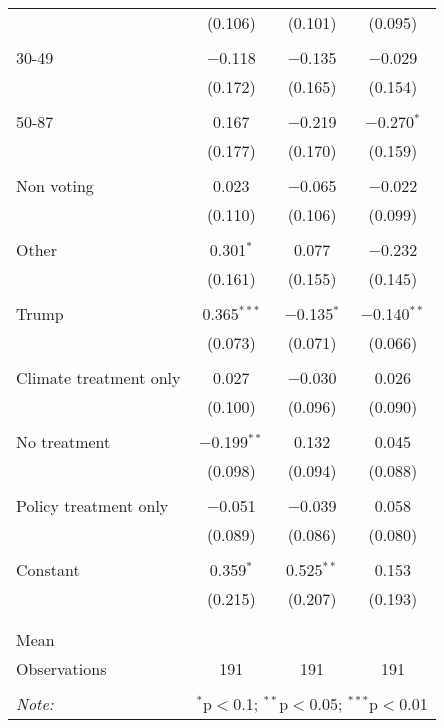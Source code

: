 \begin{tabular}{@{\extracolsep{5pt}}lccc}
  & (0.106) & (0.101) & (0.095) \\ 
  & & & \\ 
 30-49 & $-$0.118 & $-$0.135 & $-$0.029 \\ 
  & (0.172) & (0.165) & (0.154) \\ 
  & & & \\ 
 50-87 & 0.167 & $-$0.219 & $-$0.270$^{*}$ \\ 
  & (0.177) & (0.170) & (0.159) \\ 
  & & & \\ 
 Non voting & 0.023 & $-$0.065 & $-$0.022 \\ 
  & (0.110) & (0.106) & (0.099) \\ 
  & & & \\ 
 Other & 0.301$^{*}$ & 0.077 & $-$0.232 \\ 
  & (0.161) & (0.155) & (0.145) \\ 
  & & & \\ 
 Trump & 0.365$^{***}$ & $-$0.135$^{*}$ & $-$0.140$^{**}$ \\ 
  & (0.073) & (0.071) & (0.066) \\ 
  & & & \\ 
 Climate treatment only & 0.027 & $-$0.030 & 0.026 \\ 
  & (0.100) & (0.096) & (0.090) \\ 
  & & & \\ 
 No treatment & $-$0.199$^{**}$ & 0.132 & 0.045 \\ 
  & (0.098) & (0.094) & (0.088) \\ 
  & & & \\ 
 Policy treatment only & $-$0.051 & $-$0.039 & 0.058 \\ 
  & (0.089) & (0.086) & (0.080) \\ 
  & & & \\ 
 Constant & 0.359$^{*}$ & 0.525$^{**}$ & 0.153 \\ 
  & (0.215) & (0.207) & (0.193) \\ 
  & & & \\ 
\hline \\[-1.8ex] 
Mean &  &  &  \\ 
Observations & 191 & 191 & 191 \\ 
\hline 
\hline \\[-1.8ex] 
\textit{Note:}  & \multicolumn{3}{r}{$^{*}$p$<$0.1; $^{**}$p$<$0.05; $^{***}$p$<$0.01} \\ 
\end{tabular} 
